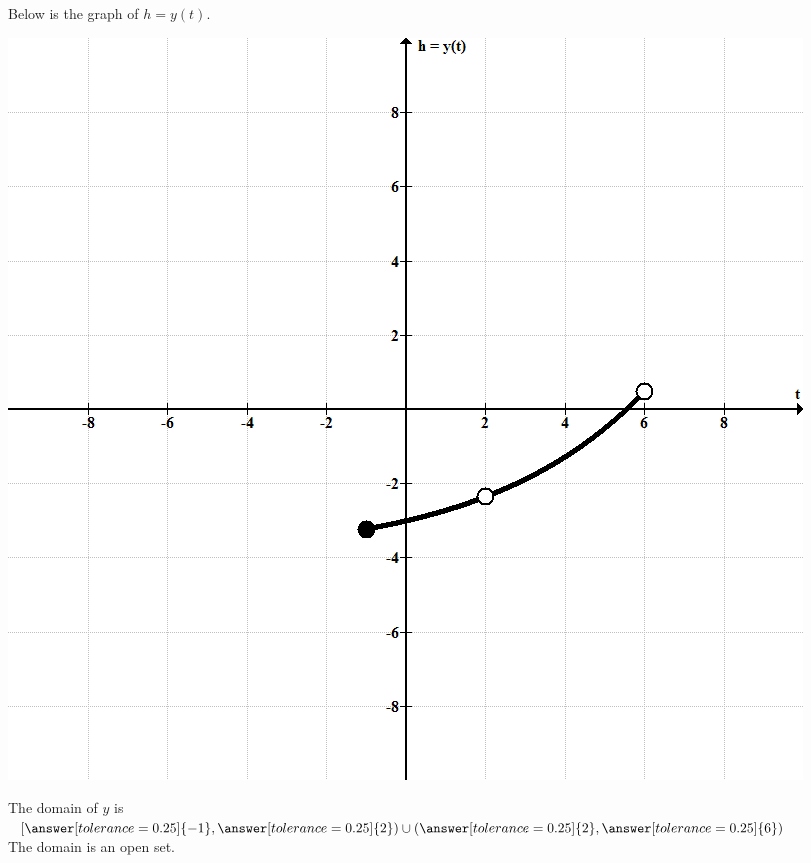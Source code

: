 \documentclass{ximera}
\author{Lee Wayand}
\begin{document}
\begin{exercise}  





Below is the graph of $h=y(t)$.  

\begin{image}
\includegraphics{../../pics/func_graphs/f4.png}
\end{image}









\begin{question} 


The domain of $y$ is  $\left[ \answer[tolerance=0.25]{-1}, \answer[tolerance=0.25]{2} \right) \cup  \left( \answer[tolerance=0.25]{2}, \answer[tolerance=0.25]{6} \right) $   \\


The domain is an open set.
\begin{multipleChoice}
\end{multipleChoice}

\end{question}






\begin{question} 



\end{question}
\end{exercise}
\end{document}
